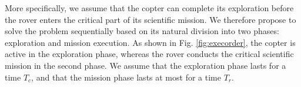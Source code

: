 \documentclass[conference]{IEEEtran}
\begin{document}
More specifically, we assume that the copter can complete its exploration before the rover enters the critical part of its scientific mission. We therefore propose to solve the problem sequentially based on its natural division into two phases: exploration and mission execution. As shown in Fig. \ref{fig:execorder}, the copter is active in the exploration phase, whereas the rover conducts the critical scientific mission in the second phase. We assume that the exploration phase lasts for a time $T_c$, and that the mission phase lasts at most for a time $T_r$.
%
%
%
%
%
%
%
%
%
\end{document}
